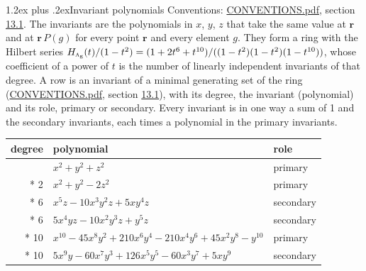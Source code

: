 \documentclass[10pt,a4paper]{article}
\makeatletter
\renewcommand\section{\@startsection{section}{1}{\z@}{-3ex plus -1ex minus -.2ex}%
  {1.2ex plus .2ex}{\normalfont\large\sffamily\bfseries\color{parttitle}}}
\numberwithin{equation}{section}
\newcommand{\irr}[1]{\text{\normalfont\scshape #1}}
\newcommand{\ptag}[1]{\mathrm{#1}}
\newcommand{\pointr}{\mathbf{r}}
\makeatother
\begin{document}
\section{Invariant polynomials}\label{s:invariant_polynomials}
Conventions: \href{../../CONVENTIONS.pdf}{CONVENTIONS.pdf}, section \href{../../CONVENTIONS.pdf\#conv.13.1}{13.1}.
The invariants are the polynomials in $x$, $y$, $z$ that take the same value at $\pointr$ and at $\pointr\,P(g)$ for every point $\pointr$ and every element $g$. They form a ring with the Hilbert series $H_{\irr{a}_{\ptag{g}}}(t)/(1-t^{2}) = (1 + 2t^{6} + t^{10})/((1-t^{2})(1-t^{2})(1-t^{10}))$, whose coefficient of a power of $t$ is the number of linearly independent invariants of that degree. \label{n:head.degree}\label{n:head.role}A row is an invariant of a minimal generating set of the ring (\href{../../CONVENTIONS.pdf}{CONVENTIONS.pdf}, section \href{../../CONVENTIONS.pdf\#conv.13.1}{13.1}), with its degree, the invariant (polynomial) and its role, primary or secondary. Every invariant is in one way a sum of 1 and the secondary invariants, each times a polynomial in the primary invariants.
{\small\begin{longtable}{@{}rll@{}}\toprule
degree & polynomial & role\\\midrule\endhead
\bottomrule\endfoot\endlastfoot
2 & $x^{2} + y^{2} + z^{2}$ & primary\\*
2 & $x^{2} + y^{2} - 2z^{2}$ & primary\\*
6 & $x^{5}z - 10x^{3}y^{2}z + 5xy^{4}z$ & secondary\\*
6 & $5x^{4}yz - 10x^{2}y^{3}z + y^{5}z$ & secondary\\*
10 & $x^{10} - 45x^{8}y^{2} + 210x^{6}y^{4} - 210x^{4}y^{6} + 45x^{2}y^{8} - y^{10}$ & primary\\*
10 & $5x^{9}y - 60x^{7}y^{3} + 126x^{5}y^{5} - 60x^{3}y^{7} + 5xy^{9}$ & secondary\\
\bottomrule\end{longtable}}
\end{document}
